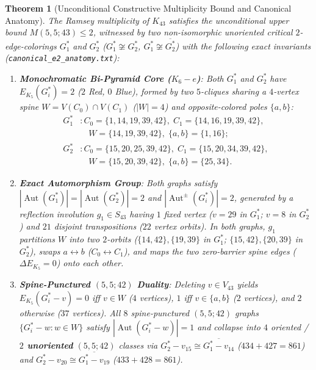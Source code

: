 \documentclass[11pt,a4paper]{article}
\theoremstyle{plain}
\newtheorem{theorem}{Theorem}[section]
\theoremstyle{definition}
\DeclareMathOperator{\Aut}{Aut}
\begin{document}
\begin{theorem}[Unconditional Constructive Multiplicity Bound and Canonical Anatomy]\label{thm:anatomy}
The Ramsey multiplicity of $K_{43}$ satisfies the unconditional upper bound $M(5,5;43) \le 2$, witnessed by two non-isomorphic unoriented critical $2$-edge-colorings $G^*_1$ and $G^*_2$ ($G^*_1 \not\cong G^*_2$, $G^*_1 \not\cong \overline{G^*_2}$) with the following exact invariants (\texttt{canonical\_\allowbreak e2\_\allowbreak anatomy.txt}):
\begin{enumerate}
  \item \textbf{Monochromatic Bi-Pyramid Core ($K_6 - e$)}: Both $G^*_1$ and $G^*_2$ have $E_{K_5}(G^*_i) = 2$ ($2$ Red, $0$ Blue), formed by two $5$-cliques sharing a $4$-vertex spine $W = V(C_0) \cap V(C_1)$ ($|W|=4$) and opposite-colored poles $\{a,b\}$:
  \begin{align*}
    G^*_1 &: C_0 = \{1,14,19,39,42\},\; C_1 = \{14,16,19,39,42\}, \\
          &\quad W = \{14,19,39,42\},\; \{a,b\} = \{1,16\};\\
    G^*_2 &: C_0 = \{15,20,25,39,42\},\; C_1 = \{15,20,34,39,42\}, \\
          &\quad W = \{15,20,39,42\},\; \{a,b\} = \{25,34\}.
  \end{align*}
  \item \textbf{Exact Automorphism Group}: Both graphs satisfy $|\Aut(G^*_1)| = |\Aut(G^*_2)| = 2$ and $|\Aut^{\pm}(G^*_i)| = 2$, generated by a reflection involution $g_1 \in S_{43}$ having $1$ fixed vertex ($v=29$ in $G^*_1$; $v=8$ in $G^*_2$) and $21$ disjoint transpositions ($22$ vertex orbits). In both graphs, $g_1$ partitions $W$ into two $2$-orbits ($\{14,42\}, \{19,39\}$ in $G^*_1$; $\{15,42\}, \{20,39\}$ in $G^*_2$), swaps $a \leftrightarrow b$ ($C_0 \leftrightarrow C_1$), and maps the two zero-barrier spine edges ($\Delta E_{K_5} = 0$) onto each other.
  \item \textbf{Spine-Punctured $(5,5;42)$ Duality}: Deleting $v \in V_{43}$ yields $E_{K_5}(G^*_i - v) = 0$ iff $v \in W$ ($4$ vertices), $1$ iff $v \in \{a,b\}$ ($2$ vertices), and $2$ otherwise ($37$ vertices). All $8$ spine-punctured $(5,5;42)$ graphs $\{G^*_i - w : w \in W\}$ satisfy $|\Aut(G^*_i - w)| = 1$ and collapse into $4$ oriented / \textbf{$2$ unoriented} $(5,5;42)$ classes via $G^*_2 - v_{15} \cong \overline{G^*_1 - v_{14}}$ ($434 + 427 = 861$) and $G^*_2 - v_{20} \cong \overline{G^*_1 - v_{19}}$ ($433 + 428 = 861$).
\end{enumerate}
\end{theorem}
\end{document}
